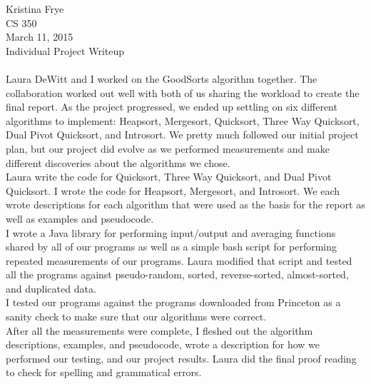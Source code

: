 \documentclass{article}
\begin{document}
Kristina Frye\\
CS 350\\
March 11, 2015\\
Individual Project Writeup\\
\\
Laura DeWitt and I worked on the GoodSorts algorithm together. The collaboration worked
out well with both of us sharing the workload to create the final report. As the project
progressed, we ended up settling on six different algorithms to implement: 
Heapsort, Mergesort, Quicksort, Three Way Quicksort, Dual Pivot Quicksort, and Introsort.
We pretty much followed our initial project plan, but our project did evolve as we performed
measurements and make different discoveries about the algorithms we chose.\\

Laura write the code for Quicksort, Three Way Quicksort, and Dual Pivot Quicksort.
I wrote the code for Heapsort, Mergesort, and Introsort. We each wrote descriptions for
each algorithm that were used as the basis for the report as well as examples and pseudocode.\\

I wrote a Java library for performing input/output and averaging functions shared by all of our programs as well as a simple bash script for performing repeated measurements of our programs.
Laura modified that script and tested all the programs against pseudo-random,
sorted, reverse-sorted, almost-sorted, and duplicated data.\\

I tested our programs against the programs downloaded from Princeton as a sanity check to make
sure that our algorithms were correct.\\

After all the measurements were complete, I fleshed out the algorithm descriptions, examples,
and pseudocode, wrote a description for how we performed our testing, and our project
results. Laura did the final proof reading to check for spelling and grammatical errors.
\end{document}

